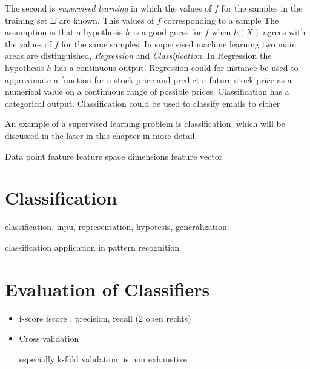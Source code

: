 The second is  \emph{supervised learning} in which the values of $f$ for the samples in the training set $\Xi$ are known. This values of $f$ corresponding to a sample  The assumption is that a hypothesis $h$ is a good guess for $f$ when $h(X)$ agrees with the values of $f$ for the same samples.
In supervised machine learning two main areas are distinguished, \emph{Regression} and \emph{Classification}. In Regression the hypothesis $h$ has a continuous output. Regression could for instance be used to approximate a function for a stock price and predict a future stock price as a numerical value on a continuous range of possible prices.
Classification has a categorical output. Classification could be used to classify emails to either 

An example of a supervised learning problem is classification, which will be discussed in the later in this chapter in more detail.





Data point
feature
feature space
dimensions
feature vector

\section{Classification}


classification, inpu, representation, hypotesis, generalization:

classification application in pattern recognition 

\section{Evaluation of Classifiers}
\begin{itemize}
\item{f-score}
fscore , precision, recall
(2 oben rechts)
\item{Cross validation}

especially k-fold validation: 
is non exhaustive


\end{itemize}
